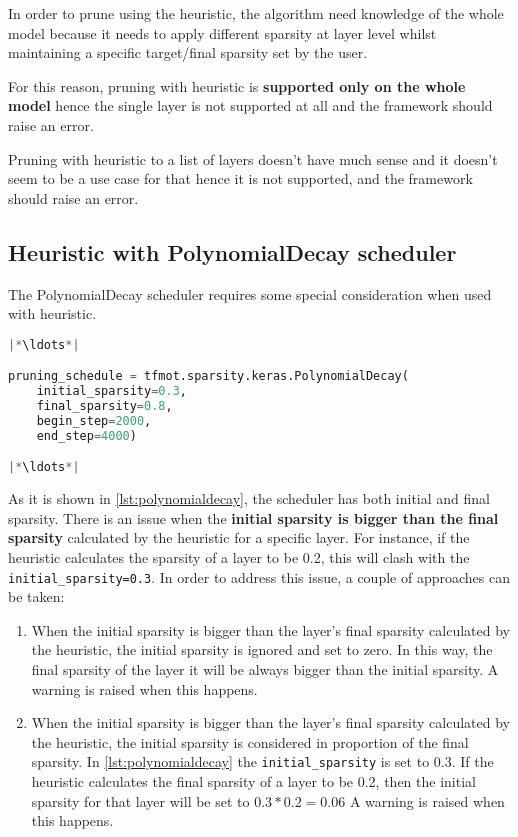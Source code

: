 In order to prune using the heuristic, the algorithm need knowledge of the
whole model because it needs to apply different sparsity at layer level whilst
maintaining a specific target/final sparsity set by the user.

For this reason, pruning with heuristic is \textbf{supported only on the whole
model} hence the single layer is not supported at all and the framework should
raise an error.

Pruning with heuristic to a list of layers doesn't have much sense and it
doesn't seem to be a use case for that hence it is not supported, and the
framework should raise an error.

\subsection{Heuristic with PolynomialDecay scheduler}
The PolynomialDecay scheduler requires some special consideration when used
with heuristic.

\begin{lstlisting}[language=Python, label={lst:polynomialdecay},
    caption=PolynomialDecay Scheduler in TFMOT]
|*\ldots*|

pruning_schedule = tfmot.sparsity.keras.PolynomialDecay(
    initial_sparsity=0.3,
    final_sparsity=0.8,
    begin_step=2000,
    end_step=4000)

|*\ldots*|
\end{lstlisting}

As it is shown in \autoref{lst:polynomialdecay}, the scheduler has both initial
and final sparsity.
There is an issue when the \textbf{initial sparsity is bigger than the final
sparsity} calculated by the heuristic for a specific layer.
For instance, if the heuristic calculates the sparsity of a layer to be 0.2,
this will clash with the \texttt{initial\_sparsity=0.3}.
In order to address this issue, a couple of approaches can be taken:

\begin{enumerate}
    \item When the initial sparsity is bigger than the layer's final sparsity
        calculated by the heuristic, the initial sparsity is ignored and set to
        zero. In this way, the final sparsity of the layer it will be always
        bigger than the initial sparsity. A warning is raised when this
        happens.
    \item When the initial sparsity is bigger than the layer's final sparsity
        calculated by the heuristic, the initial sparsity is considered in
        proportion of the final sparsity. In \autoref{lst:polynomialdecay} the
        \texttt{initial\_sparsity} is set to 0.3. If the heuristic calculates
        the final sparsity of a layer to be 0.2, then the initial sparsity for
        that layer will be set to $0.3 * 0.2 = 0.06$
        A warning is raised when this happens.
\end{enumerate}

